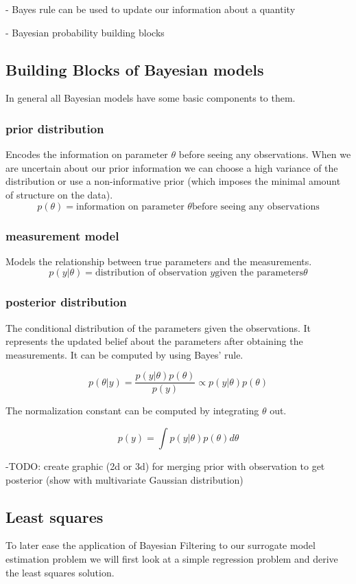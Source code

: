 - Bayes rule can be used to update our information about a quantity

- Bayesian probability building blocks

\subsection{Building Blocks of Bayesian models}
In general all Bayesian models have some basic components to them.

\subsubsection{prior distribution}
Encodes the information on parameter $\theta$ before seeing any
observations. When we are uncertain about our prior information
we can choose a high variance of the distribution or use a
non-informative prior (which imposes the minimal amount of structure
on the data).
$$ p(\theta) = \text{information on parameter } \theta
\text{before seeing any observations} $$

\subsubsection{measurement model}
Models the relationship between true parameters and the measurements.
$$ p(y | \theta) = \text{distribution of observation } y
\text{given the parameters} \theta $$

\subsubsection{posterior distribution}
The conditional distribution of the parameters given the observations.
It represents the updated belief about the parameters
after obtaining the measurements. It can be computed by using Bayes' rule.

$$ p(\theta | y) = \frac{p(y | \theta) p(\theta)}{p(y)}
\propto p(y | \theta) p(\theta) $$

The normalization constant can be computed by integrating $\theta$ out.

$$ p(y) = \int p(y | \theta) p(\theta) d\theta $$

-TODO: create graphic (2d or 3d) for merging prior with observation to get
    posterior (show with multivariate Gaussian distribution)

    
\subsection{Least squares}
To later ease the application of Bayesian Filtering to our surrogate
model estimation problem we will first look
at a simple regression problem and derive the least squares solution.

